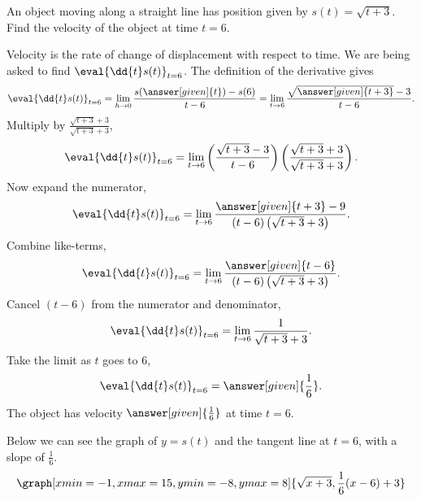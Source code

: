 \documentclass{ximera}
\begin{document}
\begin{example}
  An object moving along a straight line has position given by
  $s(t) = \sqrt{t+3}$.  Find the velocity of the object at time $t=6$.
  \begin{explanation}
    Velocity is the rate of change of displacement with respect to
    time.  We are being asked to find $\eval{\dd{t} s(t)}_{t=6}$.  The
    definition of the derivative gives
    \[
    \eval{\dd{t} s(t)}_{t=6} = \lim_{h \to 0} \frac{s(\answer[given]{t})-s(6)}{t-6} = \lim_{t\to 6} \frac{\sqrt{\answer[given]{t+3}}-3}{t-6}.
    \]
    Multiply by $\frac{\sqrt{t+3}+3}{\sqrt{t+3}+3}$,
    \[
    \eval{\dd{t} s(t)}_{t=6} = \lim_{t\to 6} \left(\frac{\sqrt{t+3}-3}{t-6} \right)\left(\frac{\sqrt{t+3}+3}{\sqrt{t+3}+3} \right).
    \]		
    Now expand the numerator,
    \[
    \eval{\dd{t} s(t)}_{t=6} = \lim_{t \to 6} \frac{\answer[given]{t+3} - 9}{(t-6)\left(\sqrt{t+3}+3 \right)}.
    \]
    Combine like-terms,
    \[
    \eval{\dd{t} s(t)}_{t=6} = \lim_{t \to 6} \frac{\answer[given]{t-6}}{(t-6)\left(\sqrt{t+3}+3\right)}.
    \]
    Cancel $(t-6)$ from the numerator and denominator,
    \[
    \eval{\dd{t} s(t)}_{t=6} = \lim_{t\to 6} \frac{1}{\sqrt{t+3}+3}.
    \]
    Take the limit as $t$ goes to $6$,
    \[
    \eval{\dd{t} s(t)}_{t=6} = \answer[given]{\frac{1}{6}}.
    \]
    The object has velocity $\answer[given]{\frac{1}{6}}$ at time $t=6$.
	\begin{onlineOnly}
	Below we can see the graph of $y=s(t)$ and the tangent line at $t=6$, with a slope of $\frac{1}{6}$. 
	\[
	\graph[xmin=-1,xmax=15,ymin=-8,ymax=8]{\sqrt{x+3}, \frac{1}{6}(x-6)+3}
	\]
	\end{onlineOnly}
	\end{explanation}
\end{example}
\end{document}
